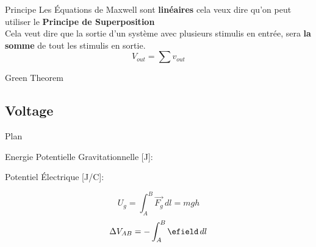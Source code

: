 \begin{frame}{Principe}
    Les Équations de Maxwell sont \textbf{linéaires} cela veux dire qu'on peut utiliser le \textbf{Principe de Superposition}\\
    \vspace{20pt}
    Cela veut dire que la sortie d'un système avec plusieurs stimulis en entrée, sera \textbf{la somme} de tout les stimulis en sortie.\\
    \vspace{20pt}
    \begin{equation}
        V_{out} = \sum v_{out}
    \end{equation}
\end{frame}

\begin{frame}{Green Theorem}
    \begin{twocolumns}[0.5]
        \leftcol
        \rightcol
    \end{twocolumns}
\end{frame}

\subsection[2min - Max]{Voltage}
\maxbackground
\begin{frame}{Plan}
    \begin{twocolumns}[0.5]
        \leftcol
            \begin{center}
            Energie Potentielle Gravitationnelle [J]:
            \end{center}
        \rightcol
            \begin{center}
            Potentiel Électrique [J/C]:\\
            \end{center}
    \end{twocolumns}
    \begin{twocolumns}[0.5]
        \leftcol
            \begin{equation}
                U_{g} = \int_{A}^{B}\vec{F_g} \,dl =  mgh
            \end{equation}
        \rightcol
            \begin{equation}
                \Delta V_{AB} = -\int_{A}^{B}\efield \,dl
            \end{equation}
    \end{twocolumns}
    \vspace{-24pt}
    \begin{twocolumns}[0.5]
        \leftcol
        \rightcol
    \end{twocolumns}
    \vfill
\end{frame}

